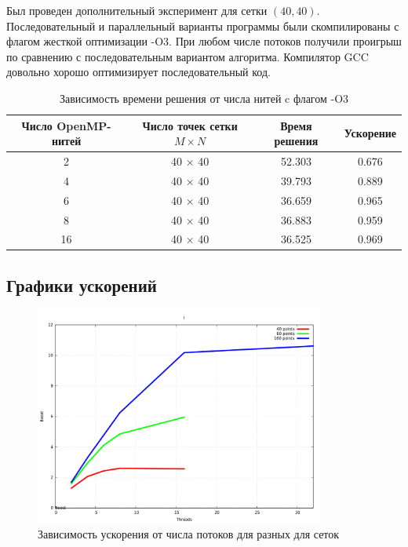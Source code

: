 \documentclass[oneside,final,14pt]{extreport}
\begin{document}
\newpage
\noindent
Был проведен дополнительный эксперимент для сетки \( (40, 40) \).
Последовательный и параллельный варианты программы были
скомпилированы с флагом жесткой оптимизации -O3. При любом числе
потоков получили проигрыш по сравнению с последовательным вариантом
алгоритма. Компилятор GCC довольно хорошо оптимизирует последовательный код.
\begin{table}[ht]
\begin{tabular}{|c|c|c|c|}
\hline
Число OpenMP-нитей & Число точек сетки \(M \times N\) &
Время решения & Ускорение \\
\hline
2  & 40 \(\times\) 40 & 52.303 & 0.676 \\
4  & 40 \(\times\) 40 & 39.793 & 0.889 \\
6  & 40 \(\times\) 40 & 36.659 & 0.965 \\
8  & 40 \(\times\) 40 & 36.883 & 0.959 \\
16 & 40 \(\times\) 40 & 36.525 & 0.969 \\
\hline
\end{tabular}
\caption{Зависимость времени решения от числа нитей c флагом -O3}
\label{tab2}
\end{table}

\subsection{Графики ускорений}
\begin{figure}[h!]
  \centering
  \includegraphics[width=0.85\textwidth]{picture5}
  \caption{Зависимость ускорения от числа потоков для разных для сеток}
\end{figure}

\newpage
\end{document}
